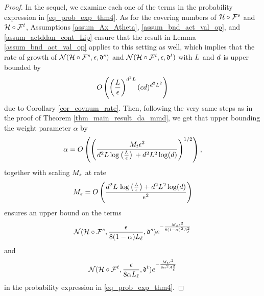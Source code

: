 \documentclass[review,supplement,onefignum,onetabnum]{siamonline250211}
\begin{document}
\begin{proof}
In the sequel, we examine each one of the terms in the probability expression in \eqref{eq_prob_exp_thm4}. As for the covering numbers of $\mathcal{H} \circ \mathcal{F}^s$ and $\mathcal{H} \circ \mathcal{F}^t$, Assumptions \ref{assum_Ax_Atheta}, \ref{assum_bnd_act_val_op}, and \ref{assum_actddan_cont_Lip} ensure that the result in Lemma \ref{assum_bnd_act_val_op} applies to this setting as well, which implies that the rate of growth of $\mathcal{N}( \mathcal{H} \circ \mathcal{F}^s, \epsilon, \mathfrak{d}^s) $ and $\mathcal{N}( \mathcal{H} \circ \mathcal{F}^t, \epsilon, \mathfrak{d}^t) $ with $L$ and ${d}$ is upper bounded by
%
\begin{equation*}
\begin{split}
O\left( \left( \frac{  L }{\epsilon}  \right)^{{d}^2 L}   (c {d})^{{d}^2 L^2} \right)
\end{split}
\end{equation*}
%
due to Corollary \ref{cor_covnum_rate}. Then, following the very same steps as in the proof of Theorem \ref{thm_main_result_da_mmd}, we get that  upper bounding the  weight parameter $\alpha$ by 
% 
\begin{equation*}
\begin{split}
\alpha
= O \left(
\left(
\frac
{M_t \epsilon^2}
{{d}^2 L \log \left( \frac{  L }{\epsilon} \right)  \, 
+ 
{d}^2 L^2 \log({d}) }
\right)^{1/2}
\right),
\end{split}
\end{equation*}
%
together with scaling $M_s $ at rate
%
\begin{equation*}
\begin{split}
M_s = 
 O \left(
\frac{{d}^2 L \, \log\left( \frac{  L }{\epsilon}  \right)
+ 
{d}^2 L^2 \log({d}) }
{\epsilon^2}
\right)
\end{split}
\end{equation*}
%
ensures an upper bound on the terms 
%
\[
\mathcal{N}( \mathcal{H} \circ \mathcal{F}^s, \frac{\epsilon}{8 (1-\alpha) L_\ell}, \mathfrak{d}^s) e^{-\frac{M_s \epsilon^2}{8 (1-\alpha)^2 A_\ell^2}} 
\]
%
and 
%
\[
\mathcal{N}( \mathcal{H} \circ \mathcal{F}^t, \frac{\epsilon}{8 \alpha L_\ell}, \mathfrak{d}^t) e^{-\frac{M_t \epsilon^2}{8 \alpha^2 A_\ell^2}} 
\]
%
in the probability expression in \eqref{eq_prob_exp_thm4}. 


\end{proof}
\end{document}
